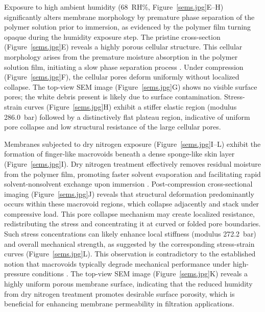 \documentclass[preprint,12pt,times]{elsarticle}
\begin{document}
Exposure to high ambient humidity (68~RH\%, Figure~\ref{sems.jpg}E--H) significantly alters membrane morphology by premature phase separation of the polymer solution prior to immersion, as evidenced by the polymer film turning opaque during the humidity exposure step. The pristine cross-section (Figure~\ref{sems.jpg}E) reveals a highly porous cellular structure. This cellular morphology arises from the premature moisture absorption in the polymer solution film, initiating a slow phase separation process \cite{Baldo2020}. Under compression (Figure~\ref{sems.jpg}F), the cellular pores deform uniformly without localized collapse. The top-view SEM image (Figure~\ref{sems.jpg}G) shows no visible surface pores; the white debris present is likely due to surface contamination. Stress-strain curves (Figure~\ref{sems.jpg}H) exhibit a stiffer elastic region (modulus 286.0~bar) followed by a distinctively flat plateau region, indicative of uniform pore collapse and low structural resistance of the large cellular pores.


Membranes subjected to dry nitrogen exposure (Figure~\ref{sems.jpg}I--L) exhibit the formation of finger-like macrovoids beneath a dense sponge-like skin layer (Figure~\ref{sems.jpg}I). Dry nitrogen treatment effectively removes residual moisture from the polymer film, promoting faster solvent evaporation and facilitating rapid solvent-nonsolvent exchange upon immersion \cite{Tan2019, DEHBAN202254}. Post-compression cross-sectional imaging (Figure~\ref{sems.jpg}J) reveals that structural deformation predominantly occurs within these macrovoid regions, which collapse adjacently and stack under compressive load. This pore collapse mechanism may create localized resistance, redistributing the stress and concentrating it at curved or folded pore boundaries. Such stress concentrations can likely enhance local stiffness (modulus 272.2~bar) and overall mechanical strength, as suggested by the corresponding stress-strain curves (Figure~\ref{sems.jpg}L). This observation is contradictory to the established notion that macrovoids typically degrade mechanical performance under high-pressure conditions \cite{Yip2010}. The top-view SEM image (Figure~\ref{sems.jpg}K) reveals a highly uniform porous membrane surface, indicating that the reduced humidity from dry nitrogen treatment promotes desirable surface porosity, which is beneficial for enhancing membrane permeability in filtration applications. 
\end{document}
